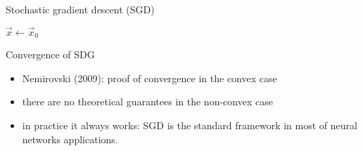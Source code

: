 \begin{frame}{Stochastic gradient descent (SGD)}
\begin{algorithm}[H]
	
	\BlankLine
	
	$\vec{x} \gets \vec{x}_0$\\
	\caption{Stochastic gradient descent}
	\label{algo:sgd}
\end{algorithm}	
\end{frame}
\begin{frame}{Convergence of SDG}
	\begin{itemize}
		\item Nemirovski (2009)\cite{Nemirovski}: proof of convergence in the convex case
		\item there are no theoretical guarantees in the non-convex case 
		\item in practice it always works: SGD is the standard framework in most of neural networks applications.
	\end{itemize}
\end{frame}
